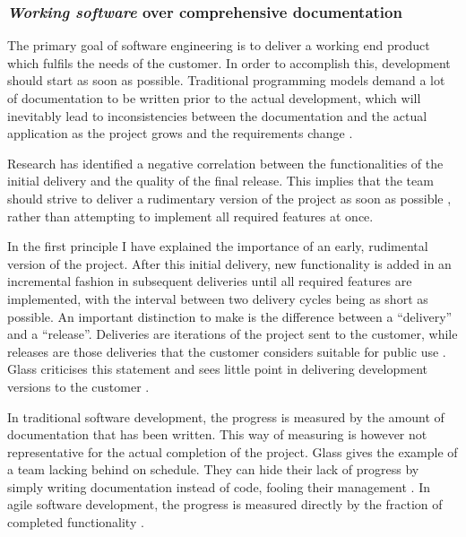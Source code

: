 \subsubsection{\emph{Working software} over comprehensive documentation}\label{sssec:agilevalue-workingsoftware}
The primary goal of software engineering is to deliver a working end product which fulfils the needs of the customer. In order to accomplish this, development should start as soon as possible. Traditional programming models demand a lot of documentation to be written prior to the actual development, which will inevitably lead to inconsistencies between the documentation and the actual application as the project grows and the requirements change \cite{Hazzan2014}. 
	
Research has identified a negative correlation between the functionalities of the initial delivery and the quality of the final release. This implies that the team should strive to deliver a rudimentary version of the project as soon as possible \cite{martin2014}, rather than attempting to implement all required features at once.

In the first principle I have explained the importance of an early, rudimental version of the project. After this initial delivery, new functionality is added in an incremental fashion in subsequent deliveries until all required features are implemented, with the interval between two delivery cycles being as short as possible. An important distinction to make is the difference between a ``delivery'' and a ``release''. Deliveries are iterations of the project sent to the customer, while releases are those deliveries that the customer considers suitable for public use  \cite{fowlerhighsmithagile}. Glass criticises this statement and sees little point in delivering development versions to the customer \cite{glass2001agile}.

In traditional software development, the progress is measured by the amount of documentation that has been written. This way of measuring is however not representative for the actual completion of the project. Glass gives the example of a team lacking behind on schedule. They can hide their lack of progress by simply writing documentation instead of code, fooling their management \cite{glass2001agile}. In agile software development, the progress is measured directly by the fraction of completed functionality \cite{martin2014}.

